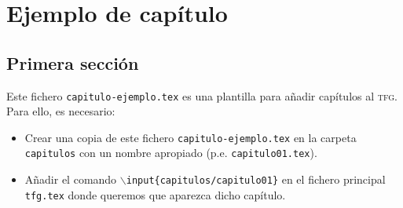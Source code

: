 
\chapter{Ejemplo de capítulo}

\section{Primera sección}

Este fichero \texttt{capitulo-ejemplo.tex} es una plantilla para añadir capítulos al \textsc{tfg}. Para ello, es necesario:
\begin{itemize}
  \item Crear una copia de este fichero \texttt{capitulo-ejemplo.tex} en la carpeta \texttt{capitulos} con un nombre apropiado (p.e. \texttt{capitulo01.tex}).
  \item Añadir el comando \texttt{$\backslash$input\{capitulos/capitulo01\}} en el fichero principal \texttt{tfg.tex} donde queremos que aparezca dicho capítulo.
\end{itemize}

\endinput
